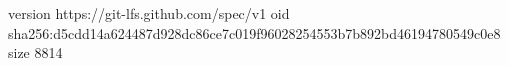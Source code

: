 version https://git-lfs.github.com/spec/v1
oid sha256:d5cdd14a624487d928dc86ce7c019f96028254553b7b892bd46194780549c0e8
size 8814
